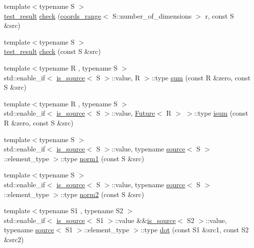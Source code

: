 \begin{DoxyCompactItemize}
\item 
{\footnotesize template$<$typename S $>$ }\\\hyperlink{structshark_1_1test__result}{test\+\_\+result} \hyperlink{namespaceshark_1_1ndim_a4af22655633852fd02e57f6e60febdff}{check} (\hyperlink{structshark_1_1ndim_1_1coords__range}{coords\+\_\+range}$<$ S\+::number\+\_\+of\+\_\+dimensions $>$ r, const S \&src)
\item 
{\footnotesize template$<$typename S $>$ }\\\hyperlink{structshark_1_1test__result}{test\+\_\+result} \hyperlink{namespaceshark_1_1ndim_ac4c2c304de61ac4b22c8b266c1627db8}{check} (const S \&src)
\item 
{\footnotesize template$<$typename R , typename S $>$ }\\std\+::enable\+\_\+if$<$ \hyperlink{classshark_1_1ndim_1_1is__source}{is\+\_\+source}$<$ S $>$\+::value, R $>$\+::type \hyperlink{namespaceshark_1_1ndim_a864213068a08615fa12bdd67d83ed324}{sum} (const R \&zero, const S \&src)
\item 
{\footnotesize template$<$typename R , typename S $>$ }\\std\+::enable\+\_\+if$<$ \hyperlink{classshark_1_1ndim_1_1is__source}{is\+\_\+source}$<$ S $>$\+::value, \hyperlink{structshark_1_1_future}{Future}$<$ R $>$ $>$\+::type \hyperlink{namespaceshark_1_1ndim_a1628755d0773dcf15427e7bd60173d42}{isum} (const R \&zero, const S \&src)
\item 
{\footnotesize template$<$typename S $>$ }\\std\+::enable\+\_\+if$<$ \hyperlink{classshark_1_1ndim_1_1is__source}{is\+\_\+source}$<$ S $>$\+::value, typename \hyperlink{structshark_1_1ndim_1_1source}{source}$<$ S $>$\+::element\+\_\+type $>$\+::type \hyperlink{namespaceshark_1_1ndim_a6daa18cea8b9b37f3525eb0416bbb203}{norm1} (const S \&src)
\item 
{\footnotesize template$<$typename S $>$ }\\std\+::enable\+\_\+if$<$ \hyperlink{classshark_1_1ndim_1_1is__source}{is\+\_\+source}$<$ S $>$\+::value, typename \hyperlink{structshark_1_1ndim_1_1source}{source}$<$ S $>$\+::element\+\_\+type $>$\+::type \hyperlink{namespaceshark_1_1ndim_a006dcceb3ef3d3456fdb7214489cb15e}{norm2} (const S \&src)
\item 
{\footnotesize template$<$typename S1 , typename S2 $>$ }\\std\+::enable\+\_\+if$<$ \hyperlink{classshark_1_1ndim_1_1is__source}{is\+\_\+source}$<$ S1 $>$\+::value \&\&\hyperlink{classshark_1_1ndim_1_1is__source}{is\+\_\+source}$<$ S2 $>$\+::value, typename \hyperlink{structshark_1_1ndim_1_1source}{source}$<$ S1 $>$\+::element\+\_\+type $>$\+::type \hyperlink{namespaceshark_1_1ndim_a9b4a2fb83e2ac9ad876f4423fc6aa8bd}{dot} (const S1 \&src1, const S2 \&src2)

\end{DoxyCompactItemize}
